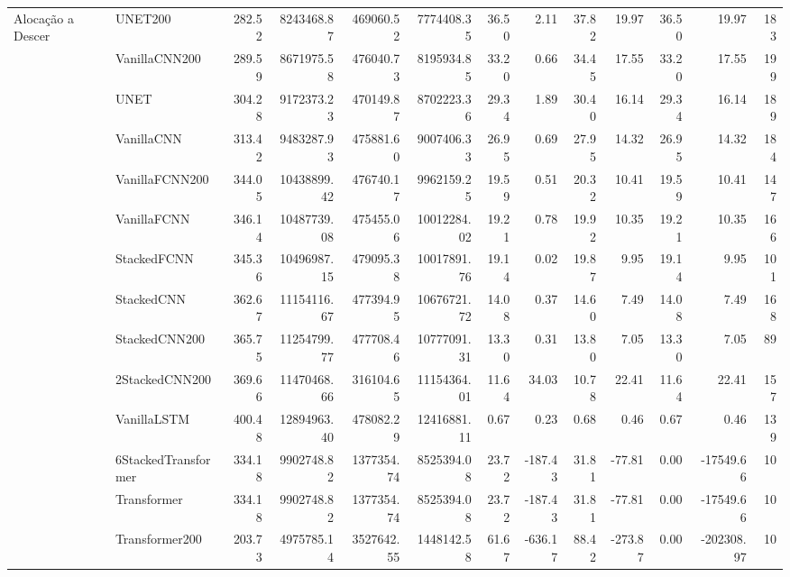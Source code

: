 \begin{tabular}{llrrrrrrrrrrr}
\cline{1-13}
\multirow[t]{14}{*}{Alocação a Descer} & UNET200 & 282.52 & 8243468.87 & 469060.52 & 7774408.35 & 36.50 & 2.11 & 37.82 & 19.97 & 36.50 & 19.97 & 183 \\
 & VanillaCNN200 & 289.59 & 8671975.58 & 476040.73 & 8195934.85 & 33.20 & 0.66 & 34.45 & 17.55 & 33.20 & 17.55 & 199 \\
 & UNET & 304.28 & 9172373.23 & 470149.87 & 8702223.36 & 29.34 & 1.89 & 30.40 & 16.14 & 29.34 & 16.14 & 189 \\
 & VanillaCNN & 313.42 & 9483287.93 & 475881.60 & 9007406.33 & 26.95 & 0.69 & 27.95 & 14.32 & 26.95 & 14.32 & 184 \\
 & VanillaFCNN200 & 344.05 & 10438899.42 & 476740.17 & 9962159.25 & 19.59 & 0.51 & 20.32 & 10.41 & 19.59 & 10.41 & 147 \\
 & VanillaFCNN & 346.14 & 10487739.08 & 475455.06 & 10012284.02 & 19.21 & 0.78 & 19.92 & 10.35 & 19.21 & 10.35 & 166 \\
 & StackedFCNN & 345.36 & 10496987.15 & 479095.38 & 10017891.76 & 19.14 & 0.02 & 19.87 & 9.95 & 19.14 & 9.95 & 101 \\
 & StackedCNN & 362.67 & 11154116.67 & 477394.95 & 10676721.72 & 14.08 & 0.37 & 14.60 & 7.49 & 14.08 & 7.49 & 168 \\
 & StackedCNN200 & 365.75 & 11254799.77 & 477708.46 & 10777091.31 & 13.30 & 0.31 & 13.80 & 7.05 & 13.30 & 7.05 & 89 \\
 & 2StackedCNN200 & 369.66 & 11470468.66 & 316104.65 & 11154364.01 & 11.64 & 34.03 & 10.78 & 22.41 & 11.64 & 22.41 & 157 \\
 & VanillaLSTM & 400.48 & 12894963.40 & 478082.29 & 12416881.11 & 0.67 & 0.23 & 0.68 & 0.46 & 0.67 & 0.46 & 139 \\
 & 6StackedTransformer & 334.18 & 9902748.82 & 1377354.74 & 8525394.08 & 23.72 & -187.43 & 31.81 & -77.81 & 0.00 & -17549.66 & 10 \\
 & Transformer & 334.18 & 9902748.82 & 1377354.74 & 8525394.08 & 23.72 & -187.43 & 31.81 & -77.81 & 0.00 & -17549.66 & 10 \\
 & Transformer200 & 203.73 & 4975785.14 & 3527642.55 & 1448142.58 & 61.67 & -636.17 & 88.42 & -273.87 & 0.00 & -202308.97 & 10 \\
\cline{1-13}
\bottomrule
\end{tabular}
